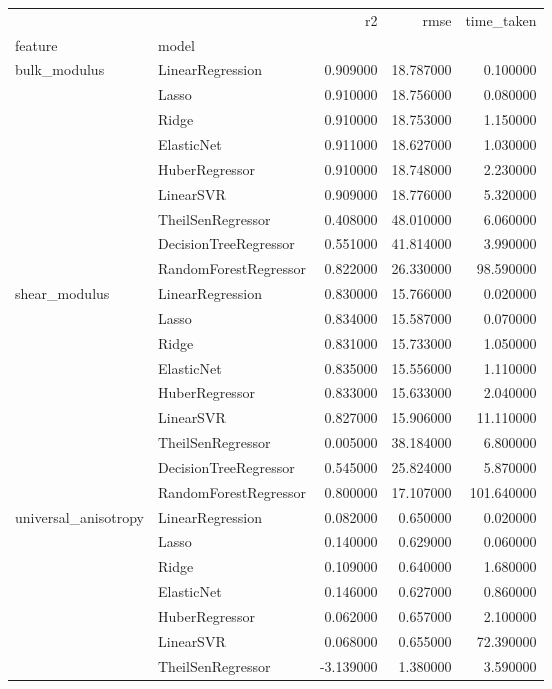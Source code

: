 \begin{tabular}{llrrr}
\toprule
 &  & r2 & rmse & time_taken \\
feature & model &  &  &  \\
\midrule
\multirow[t]{9}{*}{bulk_modulus} & LinearRegression & 0.909000 & 18.787000 & 0.100000 \\
 & Lasso & 0.910000 & 18.756000 & 0.080000 \\
 & Ridge & 0.910000 & 18.753000 & 1.150000 \\
 & ElasticNet & 0.911000 & 18.627000 & 1.030000 \\
 & HuberRegressor & 0.910000 & 18.748000 & 2.230000 \\
 & LinearSVR & 0.909000 & 18.776000 & 5.320000 \\
 & TheilSenRegressor & 0.408000 & 48.010000 & 6.060000 \\
 & DecisionTreeRegressor & 0.551000 & 41.814000 & 3.990000 \\
 & RandomForestRegressor & 0.822000 & 26.330000 & 98.590000 \\
\cline{1-5}
\multirow[t]{9}{*}{shear_modulus} & LinearRegression & 0.830000 & 15.766000 & 0.020000 \\
 & Lasso & 0.834000 & 15.587000 & 0.070000 \\
 & Ridge & 0.831000 & 15.733000 & 1.050000 \\
 & ElasticNet & 0.835000 & 15.556000 & 1.110000 \\
 & HuberRegressor & 0.833000 & 15.633000 & 2.040000 \\
 & LinearSVR & 0.827000 & 15.906000 & 11.110000 \\
 & TheilSenRegressor & 0.005000 & 38.184000 & 6.800000 \\
 & DecisionTreeRegressor & 0.545000 & 25.824000 & 5.870000 \\
 & RandomForestRegressor & 0.800000 & 17.107000 & 101.640000 \\
\cline{1-5}
\multirow[t]{9}{*}{universal_anisotropy} & LinearRegression & 0.082000 & 0.650000 & 0.020000 \\
 & Lasso & 0.140000 & 0.629000 & 0.060000 \\
 & Ridge & 0.109000 & 0.640000 & 1.680000 \\
 & ElasticNet & 0.146000 & 0.627000 & 0.860000 \\
 & HuberRegressor & 0.062000 & 0.657000 & 2.100000 \\
 & LinearSVR & 0.068000 & 0.655000 & 72.390000 \\
 & TheilSenRegressor & -3.139000 & 1.380000 & 3.590000 \\

\end{tabular}
